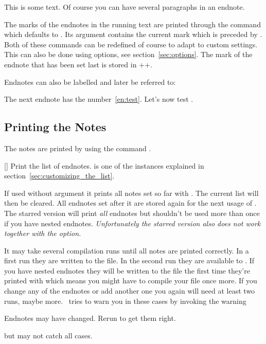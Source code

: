 \documentclass[load-preamble+]{cnltx-doc}
\begin{document}
\begin{example}
  This is some text.
  Of course you can have several paragraphs\endnote{\kant[1-3]} in an endnote.
\end{example}

The marks of the endnotes in the running text are printed through the command
 which defaults to .  Its argument
contains the current mark which is preceded by .  Both of
these commands can be redefined of course to adapt to custom settings.  This
can also be done using options, see section~\ref{sec:options}.  The mark of
the endnote that has been set last is stored in
\verbcode+\@currentlabel+.

Endnotes can also be labelled and later be referred to:
\begin{example}
  The next endnote\label{en:test} has
  the number~\ref{en:test}.  Let's now test
  \endnotemark[\ref{en:test}].
\end{example}

\subsection{Printing the Notes}
The notes are printed by using the command .
\begin{commands}
  [\sarg{}]
    Print the list of endnotes.  is one of the instances
    explained in section~\ref{sec:customizing_the_list}.
\end{commands}
If used without argument it prints all notes set so far with . The
current list will then be cleared.  All endnotes set after it are stored again
for the next usage of .  The starred version will print
\emph{all} endnotes but shouldn't be used more than once if you have nested
endnotes.  \emph{Unfortunately the starred version also does not work together
  with the  option.}

It may take several compilation runs until all notes are printed correctly.
In a first run they are written to the  file.  In the second run
they are available to .  If you have nested endnotes they
will be written to the  file the first time they're printed with
 which means you might have to compile your file once more.
If you change any of the endnotes or add another one you again will need at
least two runs, maybe more.  \enotez\ tries to warn you in these cases by
invoking the warning
\begin{flushleft}
  \ttfamily
  Endnotes may have changed.  Rerun to get them right.
\end{flushleft}
but may not catch all cases.
\end{document}
